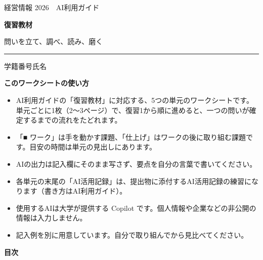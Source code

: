 \thispagestyle{cover}
\vspace*{18mm}
{\sffamily\color{pone}\large 経営情報 2026　AI利用ガイド}\par
\vspace{3mm}
{\sffamily\bfseries\fontsize{30pt}{38pt}\selectfont 復習教材}\par
\vspace{2mm}
{\sffamily\fontsize{20pt}{26pt}\selectfont 問いを立て、調べ、読み、磨く}\par
\vspace{4mm}
{\color{inktwo}\rule{\linewidth}{0.6pt}}\par
\vspace{4mm}
{\sffamily\small 学籍番号\makebox[40mm]{\hrulefill}\qquad 氏名\makebox[60mm]{\hrulefill}}\par
\vspace{10mm}

\begin{tcolorbox}[enhanced,colback=papertwo,colframe=papertwo,boxrule=0pt,arc=1.5mm,
    left=4mm,right=4mm,top=3mm,bottom=3mm,fontupper=\small]
{\sffamily\bfseries このワークシートの使い方}\par\vspace{1mm}
\begin{itemize}[label=・]
  \item AI利用ガイドの「復習教材」に対応する、5つの単元のワークシートです。単元ごとに1枚（2〜3ページ）で、復習1から順に進めると、一つの問いが確定するまでの流れをたどれます。
  \item 「■ ワーク」は手を動かす課題、「仕上げ」はワークの後に取り組む課題です。目安の時間は単元の見出しにあります。
  \item AIの出力は記入欄にそのまま写さず、要点を自分の言葉で書いてください。
  \item 各単元の末尾の「AI活用記録」は、提出物に添付するAI活用記録の練習になります（書き方はAI利用ガイド）。
  \item 使用するAIは大学が提供する Copilot です。個人情報や企業などの非公開の情報は入力しません。
  \item 記入例を別に用意しています。自分で取り組んでから見比べてください。
\end{itemize}
\end{tcolorbox}

\vspace{6mm}
{\sffamily\bfseries 目次}\par\vspace{1mm}
{\small\makeatletter{}\makeatother}
